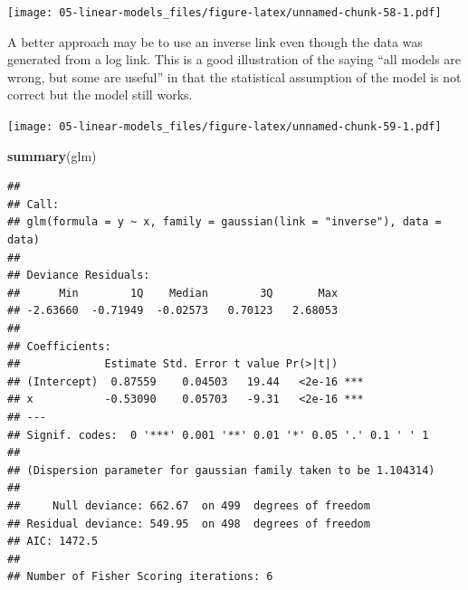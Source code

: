 \documentclass[openany]{book}
\newenvironment{Shaded}{\begin{snugshade}}{\end{snugshade}}
\newcommand{\DataTypeTok}[1]{\textcolor[rgb]{0.13,0.29,0.53}{#1}}
\newcommand{\DecValTok}[1]{\textcolor[rgb]{0.00,0.00,0.81}{#1}}
\newcommand{\FloatTok}[1]{\textcolor[rgb]{0.00,0.00,0.81}{#1}}
\newcommand{\KeywordTok}[1]{\textcolor[rgb]{0.13,0.29,0.53}{\textbf{#1}}}
\newcommand{\NormalTok}[1]{#1}
\newcommand{\OperatorTok}[1]{\textcolor[rgb]{0.81,0.36,0.00}{\textbf{#1}}}
\newcommand{\StringTok}[1]{\textcolor[rgb]{0.31,0.60,0.02}{#1}}
\begin{document}
\texttt{[image: 05-linear-models\_files/figure-latex/unnamed-chunk-58-1.pdf]}

A better approach may be to use an inverse link even though the data was generated from a log link. This is a good illustration of the saying ``all models are wrong, but some are useful'' in that the statistical assumption of the model is not correct but the model still works.

\begin{Shaded}
\end{Shaded}

\texttt{[image: 05-linear-models\_files/figure-latex/unnamed-chunk-59-1.pdf]}

\begin{Shaded}
\begin{Highlighting}[]
\KeywordTok{summary}\NormalTok{(glm)}
\end{Highlighting}
\end{Shaded}

\begin{verbatim}
## 
## Call:
## glm(formula = y ~ x, family = gaussian(link = "inverse"), data = data)
## 
## Deviance Residuals: 
##      Min        1Q    Median        3Q       Max  
## -2.63660  -0.71949  -0.02573   0.70123   2.68053  
## 
## Coefficients:
##             Estimate Std. Error t value Pr(>|t|)    
## (Intercept)  0.87559    0.04503   19.44   <2e-16 ***
## x           -0.53090    0.05703   -9.31   <2e-16 ***
## ---
## Signif. codes:  0 '***' 0.001 '**' 0.01 '*' 0.05 '.' 0.1 ' ' 1
## 
## (Dispersion parameter for gaussian family taken to be 1.104314)
## 
##     Null deviance: 662.67  on 499  degrees of freedom
## Residual deviance: 549.95  on 498  degrees of freedom
## AIC: 1472.5
## 
## Number of Fisher Scoring iterations: 6
\end{verbatim}
\end{document}
